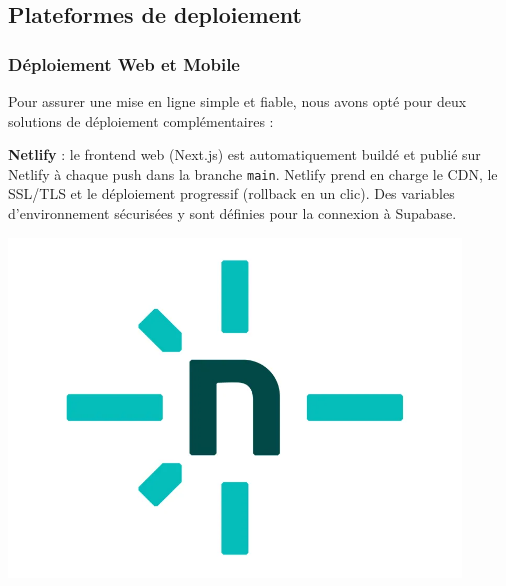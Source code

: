 \subsection{Plateformes de deploiement}


\subsubsection{Déploiement Web et Mobile}
Pour assurer une mise en ligne simple et fiable, nous avons opté pour deux solutions de déploiement complémentaires :

\begin{minipage}{0.7\textwidth}
\textbf{Netlify} : le frontend web (Next.js) est automatiquement buildé et publié sur Netlify à chaque push dans la branche \texttt{main}. Netlify prend en charge le CDN, le SSL/TLS et le déploiement progressif (rollback en un clic). Des variables d’environnement sécurisées y sont définies pour la connexion à Supabase.
\end{minipage}%
\hfill
\begin{minipage}{0.25\textwidth}
\centering
\includegraphics[width=0.9\textwidth]{assets/docs/logo_netlify.png}
\end{minipage}

\vspace{0.5cm}

